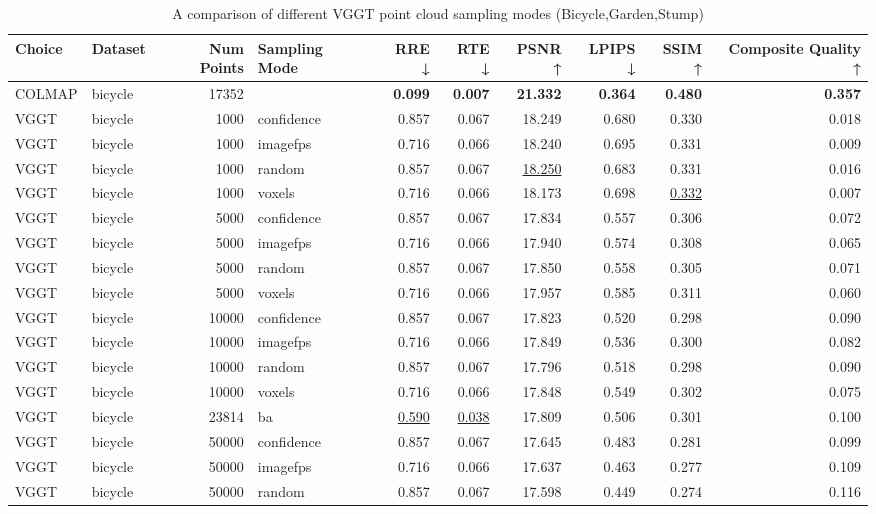 \begin{table}[H]
\caption{A comparison of different VGGT point cloud sampling modes (Bicycle,Garden,Stump)}
\label{tab:03_sampling_mode_bicycle,garden,stump}
\small
\begin{tabular}{llrlrrrrrr}
\toprule
Choice & Dataset & Num Points & Sampling Mode & RRE ↓ & RTE ↓ & PSNR ↑ & LPIPS ↓ & SSIM ↑ & Composite Quality ↑ \\
\midrule
COLMAP & bicycle & 17352 &  & \textbf{0.099} & \textbf{0.007} & \textbf{21.332} & \textbf{0.364} & \textbf{0.480} & \textbf{0.357} \\
VGGT & bicycle & 1000 & confidence & 0.857 & 0.067 & 18.249 & 0.680 & 0.330 & 0.018 \\
VGGT & bicycle & 1000 & imagefps & 0.716 & 0.066 & 18.240 & 0.695 & 0.331 & 0.009 \\
VGGT & bicycle & 1000 & random & 0.857 & 0.067 & \underline{18.250} & 0.683 & 0.331 & 0.016 \\
VGGT & bicycle & 1000 & voxels & 0.716 & 0.066 & 18.173 & 0.698 & \underline{0.332} & 0.007 \\
VGGT & bicycle & 5000 & confidence & 0.857 & 0.067 & 17.834 & 0.557 & 0.306 & 0.072 \\
VGGT & bicycle & 5000 & imagefps & 0.716 & 0.066 & 17.940 & 0.574 & 0.308 & 0.065 \\
VGGT & bicycle & 5000 & random & 0.857 & 0.067 & 17.850 & 0.558 & 0.305 & 0.071 \\
VGGT & bicycle & 5000 & voxels & 0.716 & 0.066 & 17.957 & 0.585 & 0.311 & 0.060 \\
VGGT & bicycle & 10000 & confidence & 0.857 & 0.067 & 17.823 & 0.520 & 0.298 & 0.090 \\
VGGT & bicycle & 10000 & imagefps & 0.716 & 0.066 & 17.849 & 0.536 & 0.300 & 0.082 \\
VGGT & bicycle & 10000 & random & 0.857 & 0.067 & 17.796 & 0.518 & 0.298 & 0.090 \\
VGGT & bicycle & 10000 & voxels & 0.716 & 0.066 & 17.848 & 0.549 & 0.302 & 0.075 \\
VGGT & bicycle & 23814 & ba & \underline{0.590} & \underline{0.038} & 17.809 & 0.506 & 0.301 & 0.100 \\
VGGT & bicycle & 50000 & confidence & 0.857 & 0.067 & 17.645 & 0.483 & 0.281 & 0.099 \\
VGGT & bicycle & 50000 & imagefps & 0.716 & 0.066 & 17.637 & 0.463 & 0.277 & 0.109 \\
VGGT & bicycle & 50000 & random & 0.857 & 0.067 & 17.598 & 0.449 & 0.274 & 0.116 \\

\end{tabular}
\end{table}
